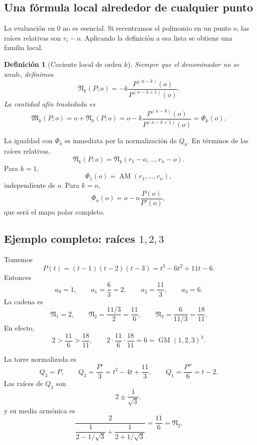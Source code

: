 \documentclass[11pt,oneside]{scrartcl}
\theoremstyle{plainblue}
\theoremstyle{definitionblue}
\newtheorem{definition}[theorem]{Definición}
\theoremstyle{remarkgray}
\newcommand{\AM}{\operatorname{AM}}
\newcommand{\GM}{\operatorname{GM}}
\newcommand{\cN}{\mathfrak{N}}
\begin{document}
\subsection{Una fórmula local alrededor de cualquier punto}

La evaluación en \(0\) no es esencial. Si recentramos el polinomio en un punto
\(o\), las raíces relativas son \(r_i-o\). Aplicando la definición a esa lista se
obtiene una familia local.

\begin{definition}[Cociente local de orden \(k\)]
Siempre que el denominador no se anule, definimos
\begin{equation}\label{eq:local-Nk}
\cN_k(P;o)
=-k\frac{P^{(n-k)}(o)}{P^{(n-k+1)}(o)}.
\end{equation}
La cantidad afín trasladada es
\begin{equation}\label{eq:local-map}
\mathfrak M_k(P;o)=o+\cN_k(P;o)
=o-k\frac{P^{(n-k)}(o)}{P^{(n-k+1)}(o)}
=\Phi_k(o).
\end{equation}
\end{definition}

La igualdad con \(\Phi_k\) es inmediata por la normalización de \(Q_k\). En términos
de las raíces relativas,
\[
\cN_k(P;o)=\cN_k(r_1-o,\dots,r_n-o).
\]
Para \(k=1\),
\[
\Phi_1(o)=\AM(r_1,\dots,r_n),
\]
independiente de \(o\). Para \(k=n\),
\[
\Phi_n(o)=o-n\frac{P(o)}{P'(o)},
\]
que será el mapa polar completo.

\subsection[Ejemplo completo: raíces 1, 2 y 3]{Ejemplo completo: raíces \(1,2,3\)}

Tomemos
\[
P(t)=(t-1)(t-2)(t-3)=t^3-6t^2+11t-6.
\]
Entonces
\[
a_0=1,
\qquad a_1=\frac{6}{3}=2,
\qquad a_2=\frac{11}{3},
\qquad a_3=6.
\]
La cadena es
\[
\cN_1=2,
\qquad
\cN_2=\frac{11/3}{2}=\frac{11}{6},
\qquad
\cN_3=\frac{6}{11/3}=\frac{18}{11}.
\]
En efecto,
\[
2>\frac{11}{6}>\frac{18}{11},
\qquad
2\cdot\frac{11}{6}\cdot\frac{18}{11}=6=\GM(1,2,3)^3.
\]

La torre normalizada es
\[
Q_3=P,
\qquad
Q_2=\frac{P'}{3}=t^2-4t+\frac{11}{3},
\qquad
Q_1=\frac{P''}{6}=t-2.
\]
Las raíces de \(Q_2\) son
\[
2\pm\frac{1}{\sqrt3},
\]
y su media armónica es
\[
\frac{2}{\dfrac1{2-1/\sqrt3}+\dfrac1{2+1/\sqrt3}}
=\frac{11}{6}=\cN_2.
\]
\end{document}
